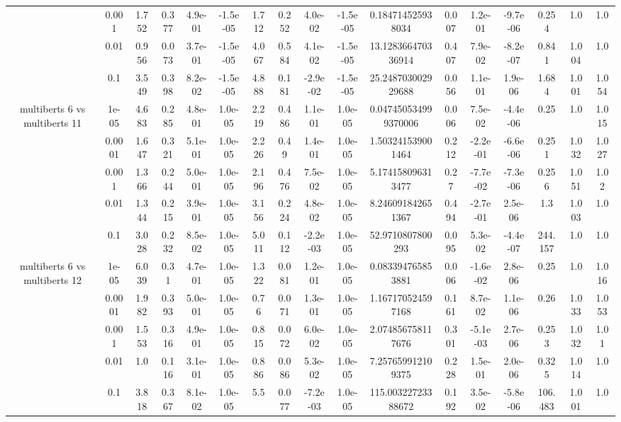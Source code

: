 \begin{tabular}{|c|c|c|c|c|c|c|c|c|c|c|c|c|c|c|c|c|}
 & 0.001 & 1.752 & 0.377 & 4.9e-01 & -1.5e-05 & 1.712 & 0.252 & 4.0e-02 & -1.5e-05 & 0.184714525938034 & 0.007 & 1.2e-01 & -9.7e-06 & 0.254 & 1.0 & 1.0 \\
 & 0.01 & 0.956 & 0.073 & 3.7e-01 & -1.5e-05 & 4.067 & 0.584 & 4.1e-02 & -1.5e-05 & 13.128366470336914 & 0.407 & 7.9e-02 & -8.2e-07 & 0.841 & 1.004 & 1.0 \\
 & 0.1 & 3.549 & 0.398 & 8.2e-02 & -1.5e-05 & 4.888 & 0.181 & -2.9e-02 & -1.5e-05 & 25.248703002929688 & 0.056 & 1.1e-01 & 1.9e-06 & 1.684 & 1.001 & 1.054 \\
\hline
\multirow{5}{*}{multiberts 6 vs multiberts 11} & 1e-05 & 4.683 & 0.285 & 4.8e-01 & 1.0e-05 & 2.219 & 0.486 & 1.1e-01 & 1.0e-05 & 0.047450534999370006 & 0.006 & 7.5e-02 & -4.4e-06 & 0.25 & 1.0 & 1.015 \\
 & 0.0001 & 1.647 & 0.321 & 5.1e-01 & 1.0e-05 & 2.226 & 0.49 & 1.4e-01 & 1.0e-05 & 1.503241539001464 & 0.212 & -2.2e-01 & -6.6e-06 & 0.251 & 1.032 & 1.027 \\
 & 0.001 & 1.366 & 0.244 & 5.0e-01 & 1.0e-05 & 2.196 & 0.476 & 7.5e-02 & 1.0e-05 & 5.174158096313477 & 0.27 & -7.7e-02 & -7.3e-06 & 0.256 & 1.051 & 1.02 \\
 & 0.01 & 1.344 & 0.215 & 3.9e-01 & 1.0e-05 & 3.156 & 0.224 & 4.8e-02 & 1.0e-05 & 8.246091842651367 & 0.494 & -2.7e-01 & 2.5e-06 & 1.3 & 1.003 & 1.0 \\
 & 0.1 & 3.028 & 0.232 & 8.5e-02 & 1.0e-05 & 5.011 & 0.112 & -2.2e-03 & 1.0e-05 & 52.9710807800293 & 0.095 & 5.3e-02 & -4.4e-07 & 244.157 & 1.0 & 1.0 \\
\hline
\multirow{5}{*}{multiberts 6 vs multiberts 12} & 1e-05 & 6.039 & 0.31 & 4.7e-01 & 1.0e-05 & 1.322 & 0.081 & 1.2e-01 & 1.0e-05 & 0.083394765853881 & 0.006 & -1.6e-02 & 2.8e-06 & 0.25 & 1.0 & 1.016 \\
 & 0.0001 & 1.982 & 0.393 & 5.0e-01 & 1.0e-05 & 0.76 & 0.071 & 1.3e-01 & 1.0e-05 & 1.167170524597168 & 0.161 & 8.7e-02 & 1.1e-06 & 0.26 & 1.033 & 1.053 \\
 & 0.001 & 1.553 & 0.316 & 4.9e-01 & 1.0e-05 & 0.815 & 0.072 & 6.0e-02 & 1.0e-05 & 2.074856758117676 & 0.301 & -5.1e-03 & 2.7e-06 & 0.253 & 1.032 & 1.01 \\
 & 0.01 & 1.0 & 0.116 & 3.1e-01 & 1.0e-05 & 0.886 & 0.086 & 5.3e-02 & 1.0e-05 & 7.257659912109375 & 0.228 & 1.5e-01 & 2.0e-06 & 0.325 & 1.014 & 1.0 \\
 & 0.1 & 3.818 & 0.367 & 8.1e-02 & 1.0e-05 & 5.5 & 0.077 & -7.2e-03 & 1.0e-05 & 115.00322723388672 & 0.192 & 3.5e-02 & -5.8e-06 & 106.483 & 1.001 & 1.0 \\

\end{tabular}
